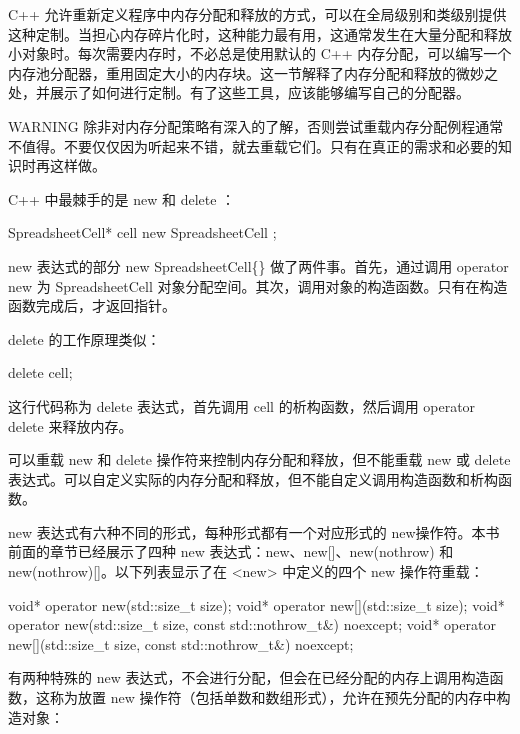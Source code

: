 
C++ 允许重新定义程序中内存分配和释放的方式，可以在全局级别和类级别提供这种定制。当担心内存碎片化时，这种能力最有用，这通常发生在大量分配和释放小对象时。每次需要内存时，不必总是使用默认的 C++ 内存分配，可以编写一个内存池分配器，重用固定大小的内存块。这一节解释了内存分配和释放的微妙之处，并展示了如何进行定制。有了这些工具，应该能够编写自己的分配器。

\begin{myWarning}{WARNING}
除非对内存分配策略有深入的了解，否则尝试重载内存分配例程通常不值得。不要仅仅因为听起来不错，就去重载它们。只有在真正的需求和必要的知识时再这样做。
\end{myWarning}


C++ 中最棘手的是 new 和 delete ：

\begin{cpp}
SpreadsheetCell* cell { new SpreadsheetCell {} };
\end{cpp}

new 表达式的部分 new SpreadsheetCell\{\} 做了两件事。首先，通过调用 operator new 为 SpreadsheetCell 对象分配空间。其次，调用对象的构造函数。只有在构造函数完成后，才返回指针。

delete 的工作原理类似：

\begin{cpp}
delete cell;
\end{cpp}

这行代码称为 delete 表达式，首先调用 cell 的析构函数，然后调用 operator delete 来释放内存。

可以重载 new 和 delete 操作符来控制内存分配和释放，但不能重载 new 或 delete 表达式。可以自定义实际的内存分配和释放，但不能自定义调用构造函数和析构函数。


new 表达式有六种不同的形式，每种形式都有一个对应形式的 new操作符。本书前面的章节已经展示了四种 new 表达式：new、new[]、new(nothrow) 和 new(nothrow)[]。以下列表显示了在 <new> 中定义的四个 new 操作符重载：

\begin{cpp}
void* operator new(std::size_t size);
void* operator new[](std::size_t size);
void* operator new(std::size_t size, const std::nothrow_t&) noexcept;
void* operator new[](std::size_t size, const std::nothrow_t&) noexcept;
\end{cpp}

有两种特殊的 new 表达式，不会进行分配，但会在已经分配的内存上调用构造函数，这称为放置 new 操作符（包括单数和数组形式），允许在预先分配的内存中构造对象：

